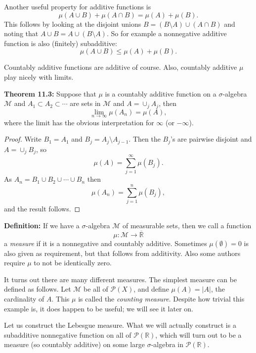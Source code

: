 \documentclass[12pt]{book}
\newcommand{\abs}[1]{\left\lvert {#1} \right\rvert}
\newcommand{\R}{{\mathbb{R}}}
\newcommand{\sM}{{\mathcal{M}}}
\newcommand{\sP}{{\mathcal{P}}}
\theoremstyle{plain}
\theoremstyle{remark}
\theoremstyle{definition}
\theoremstyle{exercise}
\theoremstyle{example}
\begin{document}
Another useful property for additive functions is
$$
\mu(A \cup B) + \mu(A \cap B) = \mu(A) + \mu(B) .
$$
This follows by looking at the disjoint unions
$B = (B \setminus A) \cup (A \cap B)$ and noting that $A \cup B = A \cup (B
\setminus A)$.  So for example a nonnegative additive function is
also (finitely) subadditive:
$$
\mu(A \cup B) \leq \mu(A) + \mu(B) .
$$

Countably additive functions are additive of course.
Also, countably additive $\mu$ play nicely with limits.

\medskip

\textbf{Theorem 11.3:}
Suppose that $\mu$ is a countably additive function on a $\sigma$-algebra
$\sM$ and $A_1 \subset A_2 \subset \cdots$ are sets in $\sM$
and $A = \cup_j A_j$, then
$$
\lim_{n \to \infty} \mu(A_n) = \mu (A) ,
$$
where the limit has the obvious interpretation for $\infty$ (or $-\infty$).

\medskip

\begin{proof}
Write $B_1 = A_1$ and $B_j = A_j \setminus A_{j-1}$.
Then the $B_j$'s are pairwise disjoint and $A = \cup_j B_j$, so
$$
\mu(A) = \sum_{j=1}^\infty \mu(B_j) .
$$
As $A_n = B_1 \cup B_2 \cup \cdots \cup B_n$ then
$$
\mu(A_n) = \sum_{j=1}^n \mu(B_j) ,
$$
and the result follows.
\end{proof}

\medskip

\textbf{Definition:}
If we have a $\sigma$-algebra $\sM$ of measurable sets, then we call a
function
$$
\mu \colon \sM \to \overline{\R}
$$
a \emph{measure} if it is a nonnegative and countably additive.  Sometimes
$\mu(\emptyset) = 0$ is also given as requirement, but that follows from
additivity.  Also some authors require $\mu$ to not be identically zero.

\medskip

It turns out there are many different measures.  The simplest measure can be
defined as follows.  Let $\sM$ be all of $\sP(X)$, and define
$\mu(A) = \abs{A}$, the cardinality of $A$.  This $\mu$ is called the
\emph{counting measure}.  Despite how trivial this example
is, it does happen to be useful; we will see it later on.

\medskip

Let us construct the Lebesgue measure.  What we will actually construct
is a subadditive nonnegative function on all of $\sP(\R)$, which will turn out to be a
measure (so countably additive) on some large $\sigma$-algebra in $\sP(\R)$.
\end{document}
